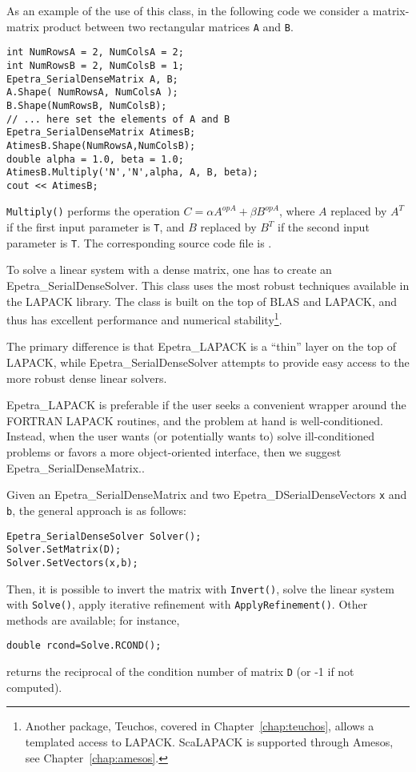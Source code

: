 As an example of the use of this class, in the following code we
consider a matrix-matrix product between two rectangular matrices
\verb!A! and \verb!B!. 
\begin{verbatim}
int NumRowsA = 2, NumColsA = 2;
int NumRowsB = 2, NumColsB = 1;
Epetra_SerialDenseMatrix A, B;
A.Shape( NumRowsA, NumColsA );
B.Shape(NumRowsB, NumColsB);
// ... here set the elements of A and B
Epetra_SerialDenseMatrix AtimesB;
AtimesB.Shape(NumRowsA,NumColsB);  
double alpha = 1.0, beta = 1.0;
AtimesB.Multiply('N','N',alpha, A, B, beta);
cout << AtimesB;
\end{verbatim}
\verb!Multiply()! performs the operation $C = \alpha A^{opA} + \beta
B^{opA}$, where $A$ replaced by $A^T$ if the first input parameter is
\verb!T!, and $B$ replaced by $B^T$ if the second input parameter is
\verb!T!.  The corresponding source code file is
.

\smallskip

To solve a linear system with a dense matrix, one has to create an
Epetra\_SerialDenseSolver. This class uses the most robust techniques
available in the LAPACK library. The class is built on the top of BLAS
and LAPACK, and thus has excellent performance and numerical
stability\footnote{Another package, Teuchos, covered in
  Chapter~\ref{chap:teuchos}, allows a templated access to LAPACK.
  ScaLAPACK is supported through Amesos, see
  Chapter~\ref{chap:amesos}.}.

The primary difference is that Epetra\_LAPACK is a ``thin'' layer on the
top of LAPACK, while Epetra\_SerialDenseSolver attempts to provide easy
access to the more robust dense linear solvers.

Epetra\_LAPACK is preferable if the user seeks a convenient wrapper
around the FORTRAN LAPACK routines, and the problem at hand is
well-conditioned. Instead, when the user wants (or potentially wants to)
solve ill-conditioned problems or favors a more object-oriented
interface, then we suggest Epetra\_SerialDenseMatrix..

\smallskip

Given an Epetra\_SerialDenseMatrix and two Epetra\_DSerialDenseVectors
{\tt x} and {\tt b}, the general approach is as follows:
\begin{verbatim}
Epetra_SerialDenseSolver Solver();
Solver.SetMatrix(D);
Solver.SetVectors(x,b);
\end{verbatim}
Then, it is possible to invert the matrix with \verb!Invert()!, solve
the linear system with \verb!Solve()!, apply iterative refinement with
\verb!ApplyRefinement()!. Other methods are available; for instance,
\begin{verbatim}
double rcond=Solve.RCOND();
\end{verbatim}
returns the reciprocal of the condition number of matrix {\tt D} (or -1
if not computed).

